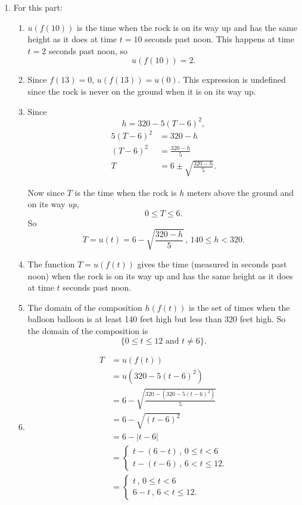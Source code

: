 \documentclass{ximera}
\begin{document}
\begin{example}
\begin{explanation}
\begin{enumerate}
\item For this part:

\begin{enumerate}
\item $u(f(10))$ is the time when the rock is on its way up and has the same height as it does at time $t=10$ seconds past noon. This happens at time $t=2$ seconds past noon, so
\[
  u(f(10)) = 2.
\]

\item Since $f(13) = 0$, $u(f(13)) = u(0)$. This expression is undefined since the rock is never on the ground when it is on its way up.

\item Since
\[
  h = 320 - 5(T-6)^2,
\]
\begin{align*}
 5(T-6)^2 &= 320 - h \\
 (T-6)^2 &= \frac{320 - h}{5} \\
  T &= 6 \pm \sqrt{\frac{320 - h}{5}} .
\end{align*}

Now since $T$ is the time when the rock is $h$ meters above the ground and on its way \emph{up}, 
\[
     0 \leq T \leq 6.
\]
So
\[
     T = u(t) =  6 - \sqrt{\frac{320 - h}{5}} \, , \, 140 \leq h < 320.
\]

\item The function $T=u(f(t))$ gives the time (measured in seconds past noon) when the rock is on its way up and has the same height as it does at time $t$ seconds past noon.

\item The domain of the composition $h(f(t))$ is the set of times when the balloon balloon is at least 140 feet high but less than 320 feet high. So the domain of the composition is
\[
  \{ 0\leq t \leq 12 \text{ and } t\neq 6  \}.
\]

\item
\begin{align*}
  T &= u(f(t))  \\
     &= u \left( 320 - 5(t-6)^2 \right)  \\
     &= 6 - \sqrt{\frac{320 - \left( 320 - 5(t-6)^2 \right)}{5}} \\
     &= 6 - \sqrt{(t-6)^2} \\
     &= 6 - \left|  t-6 \right| \\
     &= 
\begin{cases}
        t - (6-t)  \, , \, 0\leq t <6 \\
        t - (t-6)  \, , \, 6 < t \leq 12.
\end{cases} \\
      &=
\begin{cases}
        t  \, , \, 0\leq t <6 \\
        6-t  \, , \, 6 < t \leq 12.
\end{cases}
\end{align*}
\end{enumerate}
\end{enumerate}
\end{explanation}
\end{example}
\end{document}
